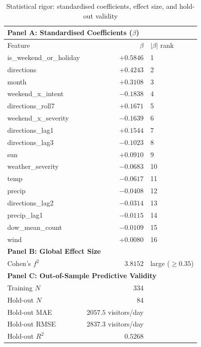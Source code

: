 \begin{table}[htbp]
\centering
\caption{Statistical rigor: standardised coefficients, effect size, and hold-out validity}
\label{tab:statistical_rigor}
\begin{tabular}{lrl}
\toprule
\multicolumn{3}{l}{\textbf{Panel A: Standardised Coefficients ($\beta$)}} \\
\midrule
Feature & $\beta$ & $|\beta|$ rank \\
\midrule
  is\_weekend\_or\_holiday & $+0.5846$ & 1 \\
  directions & $+0.4243$ & 2 \\
  month & $+0.3108$ & 3 \\
  weekend\_x\_intent & $-0.1838$ & 4 \\
  directions\_roll7 & $+0.1671$ & 5 \\
  weekend\_x\_severity & $-0.1639$ & 6 \\
  directions\_lag1 & $+0.1544$ & 7 \\
  directions\_lag3 & $-0.1023$ & 8 \\
  sun & $+0.0910$ & 9 \\
  weather\_severity & $-0.0683$ & 10 \\
  temp & $-0.0617$ & 11 \\
  precip & $-0.0408$ & 12 \\
  directions\_lag2 & $-0.0314$ & 13 \\
  precip\_lag1 & $-0.0115$ & 14 \\
  dow\_mean\_count & $-0.0109$ & 15 \\
  wind & $+0.0080$ & 16 \\
\midrule
\multicolumn{3}{l}{\textbf{Panel B: Global Effect Size}} \\
\midrule
  Cohen's $f^2$ & $3.8152$ & large ($\geq 0.35$) \\
\midrule
\multicolumn{3}{l}{\textbf{Panel C: Out-of-Sample Predictive Validity}} \\
\midrule
  Training $N$ & 334 & \\
  Hold-out $N$ & 84 & \\
  Hold-out MAE & $2057.5$ visitors/day & \\
  Hold-out RMSE & $2837.3$ visitors/day & \\
  Hold-out $R^2$ & $0.5268$ & \\
\bottomrule
\end{tabular}
\end{table}